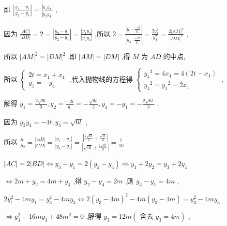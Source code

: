 \documentclass[10pt]{article}
\begin{document}
即 \(\left| \frac{{y}_{3} - {y}_{1}}{{y}_{2} - {y}_{4}}\right|  = \frac{\left| {y}_{1}{y}_{3}\right| }{\left| {y}_{2}{y}_{4}\right| }\) ,

因为 \(\frac{\left| AC\right| }{\left| BD\right| } = 2 = \left| \frac{{y}_{3} - {y}_{1}}{{y}_{2} - {y}_{4}}\right|  = \frac{\left| {y}_{1}{y}_{3}\right| }{\left| {y}_{2}{y}_{4}\right| }\) ,所以 \(2 = \frac{\left| {y}_{1} \cdot  \frac{-{4t}}{{y}_{4}}\right| }{\left| {y}_{4} \cdot  \frac{-{2t}}{{y}_{1}}\right| } = \frac{2{y}_{1}^{2}}{{y}_{4}^{2}} = \frac{2{\left| AM\right| }^{2}}{{\left| DM\right| }^{2}}\) ,

所以 \({\left| AM\right| }^{2} = {\left| DM\right| }^{2}\) ,即 \(\left| {AM}\right|  = \left| {DM}\right|\) ,得 \(M\) 为 \({AD}\) 的中点,

所以 \(\left\{  \begin{array}{l} {2t} = {x}_{1} + {x}_{4} \\  {y}_{1} =  - {y}_{4} \end{array}\right.\) ,代入抛物线的方程得 \(\left\{  \begin{array}{l} {y}_{4}{}^{2} = 4{x}_{4} = 4\left( {{2t} - {x}_{1}}\right) \\  {y}_{4}{}^{2} = {y}_{1}{}^{2} = 2{x}_{1} \end{array}\right.\) ,

解得 \({y}_{1} = \frac{2\sqrt{6t}}{3},{y}_{2} = \frac{-{2t}}{{y}_{1}} =  - \frac{\sqrt{6t}}{2},{y}_{4} =  - {y}_{1} =  - \frac{2\sqrt{6t}}{3}\) ,

因为 \({y}_{3}{y}_{4} =  - {4t},{y}_{3} = \sqrt{6t}\) ,

所以 \(\frac{{S}_{1}}{{S}_{2}} = \frac{\left| AB\right| }{\left| CD\right| } = \frac{\left| {y}_{1} - {y}_{2}\right| }{\left| {y}_{3} - {y}_{4}\right| } = \frac{\left| \frac{2\sqrt{6t}}{3} + \frac{\sqrt{6t}}{2}\right| }{\left| \sqrt{6t} + \frac{2\sqrt{6t}}{3}\right| } = \frac{7}{10}\) .

\(\left| {AC}\right|  = 2\left| {BD}\right|  \Leftrightarrow  {y}_{3} - {y}_{1} = 2\left( {{y}_{2} - {y}_{4}}\right)  \Leftrightarrow  {y}_{1} + 2{y}_{2} = {y}_{3} + 2{y}_{4}\)

\(\Leftrightarrow  {2m} + {y}_{2} = {4m} + {y}_{4}\) ,得 \({y}_{2} - {y}_{4} = {2m}\) ,则 \({y}_{3} - {y}_{1} = {4m}\) ,

\(2{y}_{1}^{2} - {4m}{y}_{1} = {y}_{3}^{2} - {4m}{y}_{3} \Leftrightarrow  2{\left( {y}_{3} - 4m\right) }^{2} - {4m}\left( {{y}_{3} - {4m}}\right)  = {y}_{3}^{2} - {4m}{y}_{3}\)

\(\Leftrightarrow  {y}_{3}^{2} - {16m}{y}_{3} + {48}{m}^{2} = 0\) ,解得 \({y}_{3} = {12m}\left( {\text{ 舍去 }{y}_{3} = {4m}}\right)\) ,
\end{document}
